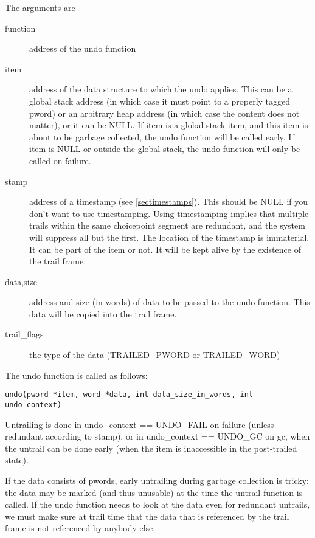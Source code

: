 The arguments are
\begin{description}
\item[function] 
    address of the undo function
\item[item] 
    address of the data structure to which the undo applies.
                This can be a global stack address (in which case it must
                point to a properly tagged pword) or an arbitrary heap
                address (in which case the content does not matter), or
                it can be NULL. If item is a global stack item, and this item
                is about to be garbage collected, the undo function will be
                called early. If item is NULL or outside the global stack,
                the undo function will only be called on failure.

\item[stamp] 
    address of a timestamp (see \ref{sectimestamps}).
    This should be NULL if you don't want
                to use timestamping. Using timestamping implies that multiple
                trails within the same choicepoint segment are redundant, and
                the system will suppress all but the first. The location of
                the timestamp is immaterial. It can be part of the item or not.
                It will be kept alive by the existence of the trail frame.
\item[data,size] 
    address and size (in words) of data to be passed to the
                undo function. This data will be copied into the trail frame.
\item[trail_flags]      the type of the data (TRAILED_PWORD or TRAILED_WORD)
\end{description}
The undo function is called as follows:
\begin{verbatim}
undo(pword *item, word *data, int data_size_in_words, int undo_context)
\end{verbatim}
Untrailing is done in
    undo_context == UNDO_FAIL
        on failure (unless redundant according to stamp), or in 
    undo_context == UNDO_GC
        on gc, when the untrail can be done early (when the item is
        inaccessible in the post-trailed state).

If the data consists of pwords, early untrailing during garbage
collection is tricky:  the data may be marked (and thus unusable)
at the time the untrail function is called. If the undo function
needs to look at the data even for redundant untrails, we must make
sure at trail time that the data that is referenced by the trail
frame is not referenced by anybody else.

